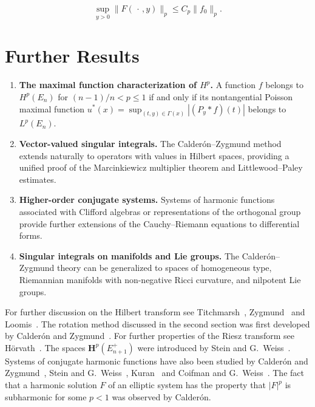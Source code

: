 \begin{equation}\label{eq:c6-4-18}
\sup_{y > 0} \|F(\,\cdot\,, y)\|_p \leq C_p \|f_0\|_p.
\end{equation}

\section{Further Results}

\begin{enumerate}
\item[5.1.] \textbf{The maximal function characterization of $H^p$.} A function $f$ belongs to $H^p(E_n)$ for $(n-1)/n < p \leq 1$ if and only if its nontangential Poisson maximal function $u^*(x) = \sup_{(t,y) \in \Gamma(x)} |(P_y * f)(t)|$ belongs to $L^p(E_n)$.

\item[5.2.] \textbf{Vector-valued singular integrals.} The Calder\'on--Zygmund method extends naturally to operators with values in Hilbert spaces, providing a unified proof of the Marcinkiewicz multiplier theorem and Littlewood--Paley estimates.

\item[5.3.] \textbf{Higher-order conjugate systems.} Systems of harmonic functions associated with Clifford algebras or representations of the orthogonal group provide further extensions of the Cauchy--Riemann equations to differential forms.

\item[5.4.] \textbf{Singular integrals on manifolds and Lie groups.} The Calder\'on--Zygmund theory can be generalized to spaces of homogeneous type, Riemannian manifolds with non-negative Ricci curvature, and nilpotent Lie groups.
\end{enumerate}

\bibnoteshead

For further discussion on the Hilbert transform see Titchmarsh~\cite{Titchmarsh2}, Zygmund~\cite{Zygmund1} and Loomis~\cite{Loomis1}. The rotation method discussed in the second section was first developed by Calder\'on and Zygmund~\cite{CalderonZygmund4}. For further properties of the Riesz transform see H\"orvath~\cite{Horvath1}. The spaces $\mathbf{H}^p(E_{n+1}^+)$ were introduced by Stein and G.~Weiss~\cite{SteinWeiss1}. Systems of conjugate harmonic functions have also been studied by Calder\'on and Zygmund~\cite{CalderonZygmund6}, Stein and G.~Weiss~\cite{SteinWeiss4}, Kuran~\cite{Kuran1} and Coifman and G.~Weiss~\cite{CoifmanWeiss2}. The fact that a harmonic solution $F$ of an elliptic system has the property that $|F|^p$ is subharmonic for some $p < 1$ was observed by Calder\'on.
